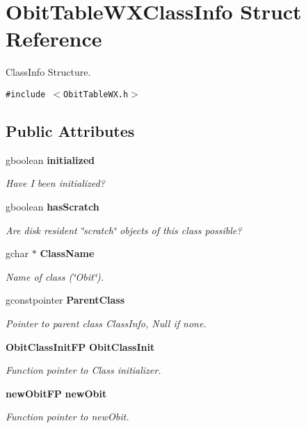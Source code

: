 \section{Obit\-Table\-WXClass\-Info Struct Reference}
\label{structObitTableWXClassInfo}
Class\-Info Structure.  


{\tt \#include $<$Obit\-Table\-WX.h$>$}

\subsection*{Public Attributes}
\begin{CompactItemize}
\item 
gboolean {\bf initialized}
\begin{CompactList}\small\item\em Have I been initialized? \item\end{CompactList}\item 
gboolean {\bf has\-Scratch}
\begin{CompactList}\small\item\em Are disk resident \char`\"{}scratch\char`\"{} objects of this class possible? \item\end{CompactList}\item 
gchar $\ast$ {\bf Class\-Name}
\begin{CompactList}\small\item\em Name of class (\char`\"{}Obit\char`\"{}). \item\end{CompactList}\item 
gconstpointer {\bf Parent\-Class}
\begin{CompactList}\small\item\em Pointer to parent class Class\-Info, Null if none. \item\end{CompactList}\item 
{\bf Obit\-Class\-Init\-FP} {\bf Obit\-Class\-Init}
\begin{CompactList}\small\item\em Function pointer to Class initializer. \item\end{CompactList}\item 
{\bf new\-Obit\-FP} {\bf new\-Obit}
\begin{CompactList}\small\item\em Function pointer to new\-Obit. \item\end{CompactList}\item 

\end{CompactItemize}
